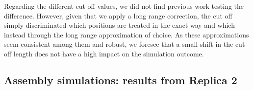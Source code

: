Regarding the different cut off values, we did not find previous work testing the difference. However, given that we apply a long range correction, the cut off simply discriminated which positions are treated in the exact way and which instead through the long range approximation of choice. As these approximations seem consistent among them and robust, we foresee that a small shift in the cut off length does not have a high impact on the simulation outcome.

\clearpage

\subsection{Assembly simulations: results from Replica 2}

\begin{figure}[h!]
\centering
{} 
 \\

\end{figure}
